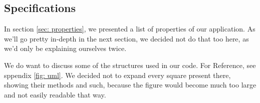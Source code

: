 \documentclass[../main.tex]{subfiles}
\begin{document}
	\subsection{Specifications}
	In section \ref{sec: properties}, we presented a list of properties of our application. As we'll go pretty in-depth in the next section, we decided not do that too here, as we'd only be explaining ourselves twice. 
	
	We do want to discuss some of the structures used in our code. For Reference, see sppendix \ref{fig: uml}. We decided not to expand every square present there, showing their methods and such, because the figure would become much too large and not easily readable that way.
\end{document}
